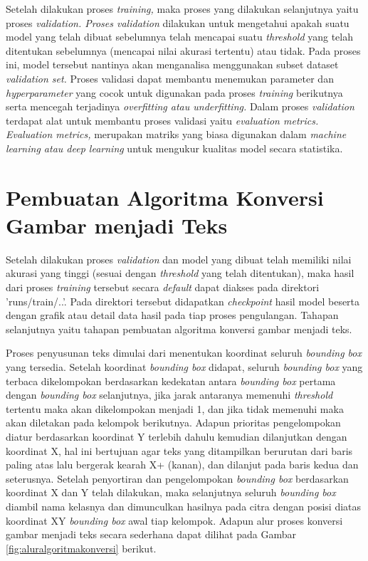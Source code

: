 Setelah dilakukan proses \textit{training,} maka proses yang dilakukan selanjutnya yaitu proses \textit{validation. \textnormal{Proses} validation} dilakukan untuk mengetahui apakah suatu model yang telah dibuat sebelumnya telah mencapai suatu \textit{threshold} yang telah ditentukan sebelumnya (mencapai nilai akurasi tertentu) atau tidak. Pada proses ini, model tersebut nantinya akan menganalisa menggunakan subset dataset \textit{validation set.} Proses validasi dapat membantu menemukan parameter dan \textit{hyperparameter} yang cocok untuk digunakan pada proses \textit{training} berikutnya serta mencegah terjadinya \textit{overfitting \textnormal{atau} underfitting.} Dalam proses \textit{validation} terdapat alat untuk membantu proses validasi yaitu \textit{evaluation metrics. Evaluation metrics,} merupakan matriks yang biasa digunakan dalam \textit{machine learning \textnormal{atau} deep learning} untuk mengukur kualitas model secara statistika.

\section{Pembuatan Algoritma Konversi Gambar menjadi Teks}
\label{sec:pembuatanmodel}

Setelah dilakukan proses \textit{validation} dan model yang dibuat telah memiliki nilai akurasi yang tinggi (sesuai dengan \textit{threshold} yang telah ditentukan), maka hasil dari proses \textit{training} tersebut secara \textit{default} dapat diakses pada  direktori 'runs/train/..'. Pada direktori tersebut didapatkan \textit{checkpoint} hasil model beserta dengan grafik atau detail data hasil pada tiap proses pengulangan. Tahapan selanjutnya yaitu tahapan pembuatan algoritma konversi gambar menjadi teks.\par

Proses penyusunan teks dimulai dari menentukan koordinat seluruh \textit{bounding box} yang tersedia. Setelah koordinat \textit{bounding box} didapat, seluruh \textit{bounding box} yang terbaca dikelompokan berdasarkan kedekatan antara \textit{bounding box} pertama dengan \textit{bounding box} selanjutnya, jika jarak antaranya memenuhi \textit{threshold} tertentu maka akan dikelompokan menjadi 1, dan jika tidak memenuhi maka akan diletakan pada kelompok berikutnya. Adapun prioritas pengelompokan diatur berdasarkan koordinat Y terlebih dahulu kemudian dilanjutkan dengan koordinat X, hal ini bertujuan agar teks yang ditampilkan berurutan dari baris paling atas lalu bergerak kearah X+ (kanan), dan dilanjut pada baris kedua dan seterusnya. Setelah penyortiran dan pengelompokan \textit{bounding box} berdasarkan koordinat X dan Y telah dilakukan, maka selanjutnya seluruh \textit{bounding box} diambil nama kelasnya dan dimunculkan hasilnya pada citra dengan posisi diatas koordinat XY \textit{bounding box} awal tiap kelompok. Adapun alur proses konversi gambar menjadi teks secara sederhana dapat dilihat pada Gambar \ref*{fig:aluralgoritmakonversi} berikut.\par


